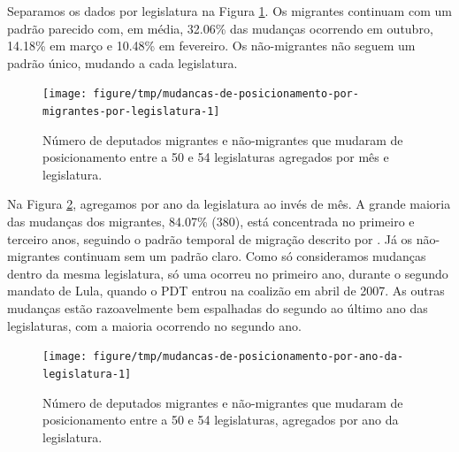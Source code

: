 \documentclass[a4paper,titlepage]{ppgi}\usepackage[]{graphicx}\usepackage[]{color}
\newenvironment{knitrout}{}{} %
\begin{document}
Separamos os dados por legislatura na Figura
\ref{fig:mudancas-de-posicionamento-por-migrantes-por-legislatura}. Os
migrantes continuam com um padrão parecido com, em média,
32.06\%
das mudanças ocorrendo em outubro,
14.18\%
em março e
10.48\%
em fevereiro. Os não-migrantes não seguem um padrão único, mudando a cada
legislatura.

\begin{knitrout}
\color{fgcolor}\begin{figure}
\texttt{[image: figure/tmp/mudancas-de-posicionamento-por-migrantes-por-legislatura-1]} \caption[Número de deputados migrantes e não-migrantes que mudaram de posicionamento entre a 50\textordfeminine{} e 54\textordfeminine{} legislaturas agregados por mês e legislatura]{Número de deputados migrantes e não-migrantes que mudaram de posicionamento entre a 50\textordfeminine{} e 54\textordfeminine{} legislaturas agregados por mês e legislatura.}\label{fig:mudancas-de-posicionamento-por-migrantes-por-legislatura}
\end{figure}


\end{knitrout}

Na Figura \ref{fig:mudancas-de-posicionamento-por-ano-da-legislatura},
agregamos por ano da legislatura ao invés de mês. A grande maioria das
mudanças dos migrantes,
84.07\%
(380), está concentrada no
primeiro e terceiro anos, seguindo o padrão temporal de migração descrito por
. Já os não-migrantes continuam sem um padrão claro.
Como só consideramos mudanças dentro da mesma legislatura, só uma ocorreu no
primeiro ano, durante o segundo mandato de Lula, quando o PDT entrou na
coalizão em abril de 2007. As outras mudanças estão razoavelmente bem
espalhadas do segundo ao último ano das legislaturas, com a maioria ocorrendo
no segundo ano.

\begin{knitrout}
\color{fgcolor}\begin{figure}
\texttt{[image: figure/tmp/mudancas-de-posicionamento-por-ano-da-legislatura-1]} \caption[Número de deputados migrantes e não-migrantes que mudaram de posicionamento entre a 50\textordfeminine{} e 54\textordfeminine{} legislaturas, agregados por ano da legislatura]{Número de deputados migrantes e não-migrantes que mudaram de posicionamento entre a 50\textordfeminine{} e 54\textordfeminine{} legislaturas, agregados por ano da legislatura.}\label{fig:mudancas-de-posicionamento-por-ano-da-legislatura}
\end{figure}


\end{knitrout}
\end{document}
